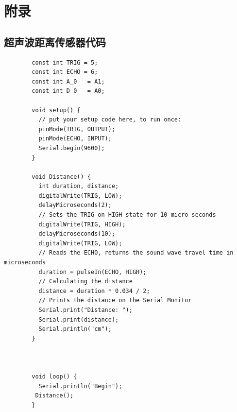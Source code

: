 \documentclass[conference]{IEEEtran}
\theoremstyle{break}
\begin{document}
\section{附录}
\subsection{超声波距离传感器代码}
\begin{lstlisting}
        const int TRIG = 5;
        const int ECHO = 6;
        const int A_0   = A1;
        const int D_0   = A0;
        
        void setup() {
          // put your setup code here, to run once:
          pinMode(TRIG, OUTPUT);
          pinMode(ECHO, INPUT);
          Serial.begin(9600);
        }
        
        void Distance() {
          int duration, distance;
          digitalWrite(TRIG, LOW);
          delayMicroseconds(2);
          // Sets the TRIG on HIGH state for 10 micro seconds
          digitalWrite(TRIG, HIGH);
          delayMicroseconds(10);
          digitalWrite(TRIG, LOW);
          // Reads the ECHO, returns the sound wave travel time in microseconds
          duration = pulseIn(ECHO, HIGH);
          // Calculating the distance
          distance = duration * 0.034 / 2;
          // Prints the distance on the Serial Monitor
          Serial.print("Distance: ");
          Serial.print(distance);
          Serial.println("cm");
        }
        
        
        
        void loop() {
          Serial.println("Begin");
         Distance();
        }
                                             
\end{lstlisting}
\end{document}
